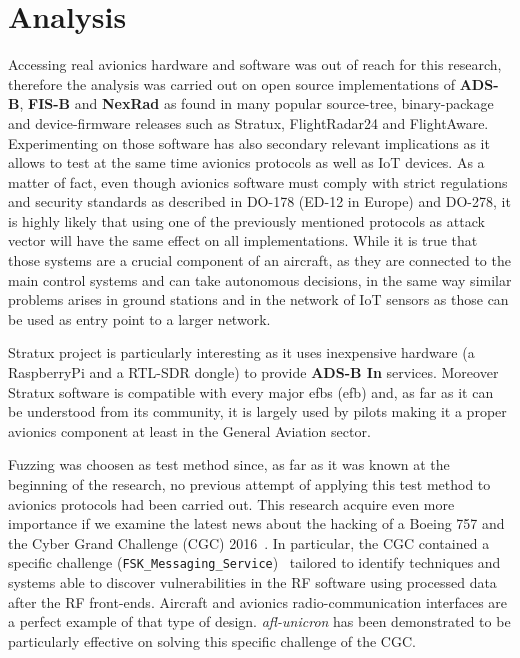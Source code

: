 \documentclass[../main.tex]{subfiles}
\begin{document}
\chapter{Analysis}
\label{chap:experimsetup}

Accessing real avionics hardware and software was out of reach for this research, therefore the analysis was carried out on open source implementations of \textbf{ADS-B}, \textbf{FIS-B} and \textbf{NexRad} as found in many popular source-tree, binary-package and device-firmware releases such as Stratux, FlightRadar24 and FlightAware. Experimenting on those software has also secondary relevant implications as it allows to test at the same time avionics protocols as well as IoT devices. As a matter of fact, even though avionics software must comply with strict regulations and security standards as described in DO-178 (ED-12 in Europe) and DO-278, it is highly likely that using one of the previously mentioned protocols as attack vector will have the same effect on all implementations. While it is true that those systems are a crucial component of an aircraft, as they are connected to the main control systems and can take autonomous decisions, in the same way similar problems arises in ground stations and in the network of IoT sensors as those can be used as entry point to a larger network.

Stratux project is particularly interesting as it uses inexpensive hardware (a RaspberryPi and a RTL-SDR dongle) to provide \textbf{ADS-B In} services.
Moreover Stratux software is compatible with every major \acrlong{efb}s (\acrshort{efb}) and, as far as it can be understood from its community, it is largely used by pilots making it a proper avionics component at least in the General Aviation sector.

Fuzzing was choosen as test method since, as far as it was known at the beginning of the research, no previous attempt of applying this test method to avionics protocols had been carried out. This research acquire even more importance if we examine the latest news about the hacking of a Boeing 757 and the Cyber Grand Challenge (CGC) 2016~\cite{CGC}. In particular, the CGC contained a specific challenge (\texttt{FSK\_Messaging\_Service})~\cite{CGC-FSK} tailored to identify techniques and systems able to discover vulnerabilities in the RF software using processed data after the RF front-ends. Aircraft and avionics radio-communication interfaces are a perfect example of that type of design.
\textit{afl-unicron} has been demonstrated to be particularly effective on solving this specific challenge of the CGC.
\end{document}
